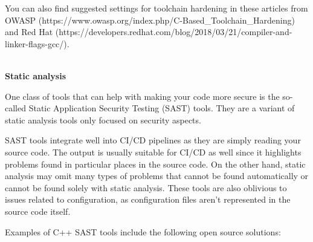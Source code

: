 You can also find suggested settings for toolchain hardening in these articles from OWASP (https://www.owasp.org/index.php/C-Based\_Toolchain\_Hardening) and Red Hat (https://developers.redhat.com/blog/2018/03/21/compiler-and-linker-flags-gcc/).

\hspace*{\fill} \\ %
\noindent
\textbf{Static analysis}

One class of tools that can help with making your code more secure is the so-called Static Application Security Testing (SAST) tools. They are a variant of static analysis tools only focused on security aspects.

SAST tools integrate well into CI/CD pipelines as they are simply reading your source code. The output is usually suitable for CI/CD as well since it highlights problems found in particular places in the source code. On the other hand, static analysis may omit many types of problems that cannot be found automatically or cannot be found solely with static analysis. These tools are also oblivious to issues related to configuration, as configuration files aren't represented in the source code itself.

Examples of C++ SAST tools include the following open source solutions:

